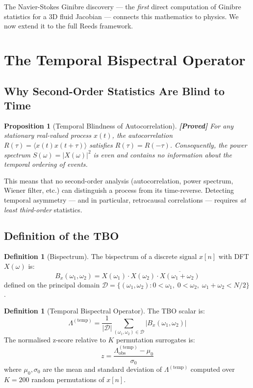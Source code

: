 \documentclass[12pt,a4paper]{article}
\newcommand{\proved}[1]{\textcolor{proved}{\textbf{[Proved]}} #1}
\newtheorem{proposition}[theorem]{Proposition}
\theoremstyle{definition}
\newtheorem{definition}[theorem]{Definition}
\theoremstyle{remark}
\newcommand{\TBO}{\Lambda^{\mathrm{(temp)}}}
\begin{document}
The Navier-Stokes Ginibre discovery \cite{dwr_ns} --- the \emph{first} direct
computation of Ginibre statistics for a 3D fluid Jacobian --- connects this
mathematics to physics. We now extend it to the full Reeds framework.

\section{The Temporal Bispectral Operator}
\label{sec:tbo}

\subsection{Why Second-Order Statistics Are Blind to Time}

\begin{proposition}[Temporal Blindness of Autocorrelation]
\label{prop:blind}
\proved{For any stationary real-valued process $x(t)$, the autocorrelation
$R(\tau) = \langle x(t) x(t + \tau) \rangle$ satisfies $R(\tau) = R(-\tau)$.
Consequently, the power spectrum $S(\omega) = |X(\omega)|^2$ is even and
contains no information about the temporal ordering of events.}
\end{proposition}

This means that no second-order analysis (autocorrelation, power spectrum,
Wiener filter, etc.) can distinguish a process from its time-reverse. Detecting
temporal asymmetry --- and in particular, retrocausal correlations --- requires
\emph{at least third-order} statistics.

\subsection{Definition of the TBO}

\begin{definition}[Bispectrum]
\label{def:bispec}
The bispectrum of a discrete signal $x[n]$ with DFT $X(\omega)$ is:
\begin{equation}
  B_x(\omega_1, \omega_2) = X(\omega_1) \cdot X(\omega_2) \cdot \overline{X(\omega_1 + \omega_2)}
\end{equation}
defined on the principal domain $\mathcal{D} = \{(\omega_1, \omega_2) : 0 < \omega_1, \; 0 < \omega_2, \; \omega_1 + \omega_2 < N/2\}$.
\end{definition}

\begin{definition}[Temporal Bispectral Operator]
\label{def:tbo}
The TBO scalar is:
\begin{equation}
  \TBO = \frac{1}{|\mathcal{D}|} \sum_{(\omega_1, \omega_2) \in \mathcal{D}} |B_x(\omega_1, \omega_2)|
\end{equation}
The normalised z-score relative to $K$ permutation surrogates is:
\begin{equation}
  z = \frac{\TBO_{\mathrm{obs}} - \mu_0}{\sigma_0}
\end{equation}
where $\mu_0, \sigma_0$ are the mean and standard deviation of $\TBO$ computed
over $K = 200$ random permutations of $x[n]$.
\end{definition}
\end{document}

